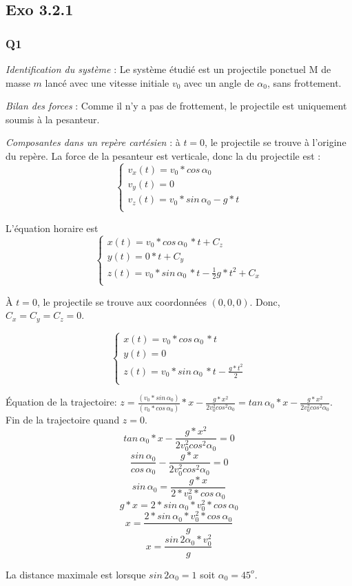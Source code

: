 \documentclass[]{book}
\theoremstyle{definition}
\begin{document}
\subsection*{Exo 3.2.1}
	
\subsubsection*{Q1}
\emph{Identification du syst\`eme} : Le syst\`eme \'etudi\'e est un projectile ponctuel M de masse $m$ lanc\'e avec une vitesse initiale $v_0$ avec un angle de $\alpha_0$, sans frottement. 


\emph{Bilan des forces} : Comme il n'y a pas de frottement, le projectile est uniquement soumis \`a la pesanteur.
 

\emph{Composantes dans un rep\`ere cart\'esien} : \`a $t=0$, le projectile se trouve \`a l'origine du rep\`ere. La force de la pesanteur est verticale, donc la du projectile est :
$$
\left\{
\begin{array}{l}
 v_x(t) = v_0*cos\, \alpha_0 \\
 v_y(t) = 0 \\
 v_z(t) = v_0*sin\, \alpha_0 - g*t \\
\end{array}
\right. 
$$

L'\'equation horaire est
$$
\left\{
\begin{array}{l}
 x(t) = v_0*cos\, \alpha_0\, *t + C_z\\
 y(t) = 0*t + C_y \\
 z(t) = v_0*sin\, \alpha_0\, *t - \frac{1}{2}g*t^2 + C_x\\
\end{array}
\right. 
$$

\`A $t=0$, le projectile se trouve aux coordonn\'ees $(0,0,0)$. Donc, $C_x=C_y=C_z=0$.

$$
\left\{
\begin{array}{l}
 x(t) = v_0*cos\, \alpha_0\, *t\\
 y(t) = 0\\
 z(t) = v_0*sin\, \alpha_0\, *t - \frac{g*t^2}{2} \\
\end{array}
\right. 
$$

\'Equation de la trajectoire: $z = \frac{(v_0*sin\, \alpha_0)}{(v_0*cos\, \alpha_0)}*x - \frac{g*x^2}{2v_0^2cos^2\alpha_0} = tan\, \alpha_0*x - \frac{g*x^2}{2v_0^2cos^2\alpha_0}$. \\

Fin de la trajectoire quand $z=0$. 
$$tan\, \alpha_0*x - \frac{g*x^2}{2v_0^2cos^2\alpha_0} = 0$$
$$\frac{sin\, \alpha_0}{cos\, \alpha_0} - \frac{g*x}{2v_0^2cos^2\alpha_0} = 0$$
$$sin\, \alpha_0 = \frac{g*x}{2*v_0^2*cos\, \alpha_0}$$
$$g*x= 2*sin\, \alpha_0*v_0^2*cos\, \alpha_0$$
$$x= \frac{2*sin\, \alpha_0*v_0^2*cos\, \alpha_0}{g}$$
$$x= \frac{sin\, 2\alpha_0*v_0^2}{g}$$

La distance maximale est lorsque $sin\, 2\alpha_0 = 1$ soit $\alpha_0 = 45^{o}$.
\end{document}

